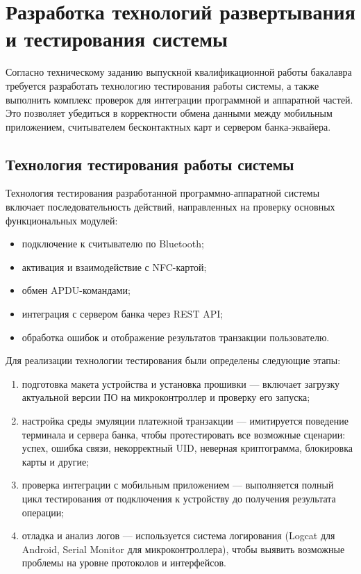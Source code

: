 \newpage

\section{Разработка технологий развертывания и тестирования системы}

Согласно техническому заданию выпускной квалификационной работы бакалавра требуется разработать технологию тестирования работы системы, а также выполнить комплекс проверок для интеграции программной и аппаратной частей.
Это позволяет убедиться в корректности обмена данными между мобильным приложением, считывателем бесконтактных карт и сервером банка-эквайера.

\subsection{Технология тестирования работы системы}
Технология тестирования разработанной программно-аппаратной системы включает последовательность действий, направленных на проверку основных функциональных модулей:

\begin{itemize}
	\item подключение к считывателю по Bluetooth;
	\item активация и взаимодействие с NFC-картой;
	\item обмен APDU-командами;
	\item интеграция с сервером банка через REST API;
	\item обработка ошибок и отображение результатов транзакции пользователю.
\end{itemize}

Для реализации технологии тестирования были определены следующие этапы:

\begin{enumerate}
	\item подготовка макета устройства и установка прошивки — включает загрузку актуальной версии ПО на микроконтроллер и проверку его запуска;
	\item настройка среды эмуляции платежной транзакции — имитируется поведение терминала и сервера банка, чтобы протестировать все возможные сценарии: успех, ошибка связи, некорректный UID, неверная криптограмма, блокировка карты и другие;
	\item проверка интеграции с мобильным приложением — выполняется полный цикл тестирования от подключения к устройству до получения результата операции;
	\item отладка и анализ логов — используется система логирования (Logcat для Android, Serial Monitor для микроконтроллера), чтобы выявить возможные проблемы на уровне протоколов и интерфейсов.
\end{enumerate}

